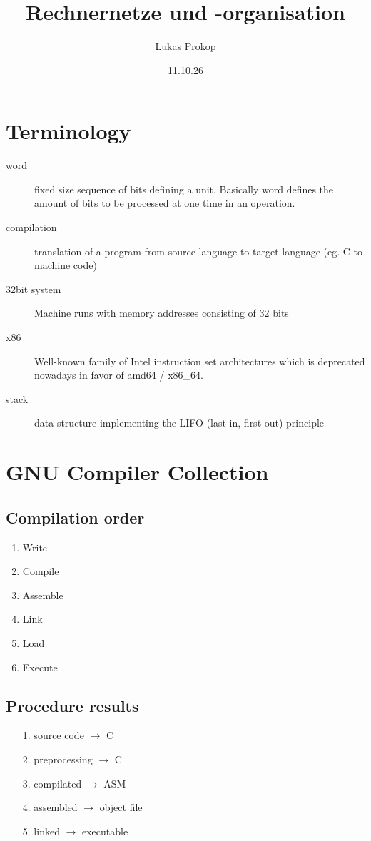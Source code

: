 \documentclass[a4paper,twocolumn]{article}
\title{Rechnernetze und -organisation}
\date{11.10.26}
\author{Lukas Prokop}
\newcommand{\ra}{\rightarrow}
\begin{document}
\maketitle
\tableofcontents

\section{Terminology}

\begin{description}
  \item[word] fixed size sequence of bits defining a unit.
        Basically word defines the amount of bits to be processed
        at one time in an operation.
  \item[compilation] translation of a program from source language
        to target language (eg. C to machine code)
  \item[32bit system] Machine runs with memory addresses consisting
        of 32 bits
  \item[x86] Well-known family of Intel instruction set architectures
        which is deprecated nowadays in favor of amd64 / x86\_64.
  \item[stack] data structure implementing the LIFO (last in, first out)
        principle
\end{description}

\section{GNU Compiler Collection}

\subsection{Compilation order}

\begin{enumerate}
  \item Write
  \item Compile
  \item Assemble
  \item Link
  \item Load
  \item Execute
\end{enumerate}

\subsection{Procedure results}

\begin{enumerate}
  \item[1.] source code   $\ra$ C
  \item[2.] preprocessing $\ra$ C
  \item[3.] compilated    $\ra$ ASM
  \item[4.] assembled     $\ra$ object file
  \item[5.] linked        $\ra$ executable
\end{enumerate}
\end{document}
